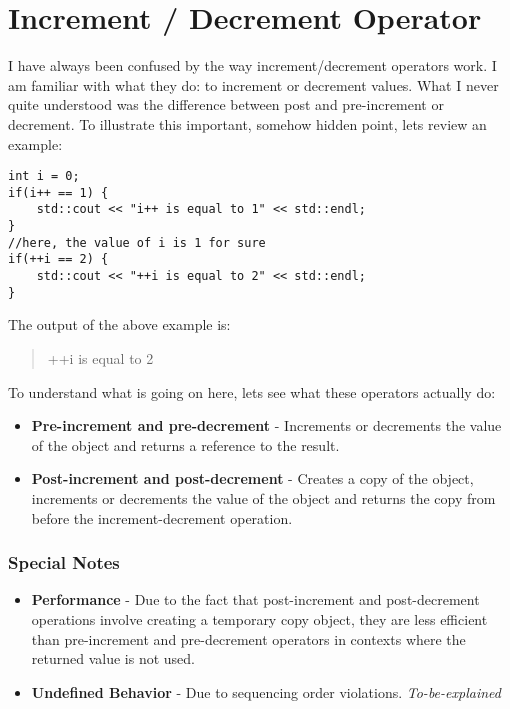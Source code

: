 \chapter{Increment / Decrement Operator}

I have always been confused by the way increment/decrement operators work. I am familiar with what they do: to increment or decrement values. What I never quite understood was the difference between post and pre-increment or decrement.
To illustrate this important, somehow hidden point, lets review an example:

\begin{lstlisting}
int i = 0;
if(i++ == 1) {
	std::cout << "i++ is equal to 1" << std::endl;
}
//here, the value of i is 1 for sure
if(++i == 2) {
	std::cout << "++i is equal to 2" << std::endl;
}
\end{lstlisting}

The output of the above example is:
\begin{quote}
++i is equal to 2
\end{quote}

To understand what is going on here, lets see what these operators actually do:
\begin{itemize}
\item \textbf{Pre-increment and pre-decrement} - Increments or decrements the value of the object and returns a reference to the result.
\item \textbf{Post-increment and post-decrement} - Creates a copy of the object, increments or decrements the value of the object and returns the copy from before the increment-decrement operation.
\end{itemize}

\subsection{Special Notes}
\begin{itemize}
\item \textbf{Performance} - Due to the fact that post-increment and post-decrement operations involve creating a temporary copy object, they are less efficient than pre-increment and pre-decrement operators in contexts where the returned value is not used.
\item \textbf{Undefined Behavior} - Due to sequencing order violations. \emph{To-be-explained}
\end{itemize}